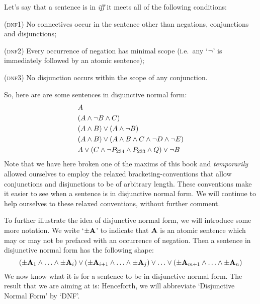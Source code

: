 Let's say that a sentence is in  \emph{iff} it meets all of the following conditions:
	\begin{earg}
		\item[(\textsc{dnf1})] No connectives occur in the sentence other than negations, conjunctions and disjunctions;
		\item[(\textsc{dnf2})] Every occurrence of negation has minimal scope (i.e.\ any `$\neg$' is immediately followed by an atomic sentence);
		\item[(\textsc{dnf3})] No disjunction occurs within the scope of any conjunction.
	\end{earg}
So, here are are some sentences in disjunctive normal form:
\begin{align*}
  & A \\
  & (A \wedge \lnot B \wedge C)\\
  & (A \wedge B) \vee (A \wedge \neg B)\\
  & (A \wedge B) \vee (A \wedge  B \wedge C \wedge \neg D \wedge \neg E)\\
  & A \vee (C \wedge \neg P_{234} \wedge P_{233} \wedge Q) \vee \neg B
\end{align*}
Note that we have here broken one of the maxims of this book and \emph{temporarily} allowed ourselves to employ the relaxed bracketing-conventions that allow conjunctions and disjunctions to be of arbitrary length. These conventions make it easier to see when a sentence is in disjunctive normal form. We will continue to help ourselves to these relaxed conventions, without further comment.

To further illustrate the idea of disjunctive normal form, we will introduce some more notation. We write `$\pm\mathbf{A}$' to indicate that $\mathbf{A}$ is an atomic sentence which may or may not be prefaced with an occurrence of negation. Then a sentence in disjunctive normal form has the following shape:
	$$(\pm \mathbf{A}_1 \land \ldots \land \pm \mathbf{A}_i) \lor (\pm \mathbf{A}_{i+1} \land \ldots \land \pm\mathbf{A}_j) \lor \ldots \lor (\pm\mathbf{A}_{m+1} \land \ldots \land \pm \mathbf{A}_n)$$
We now know what it is for a sentence to be in disjunctive normal form. The result that we are aiming at is:
Henceforth, we will abbreviate `Disjunctive Normal Form' by `DNF'. 


